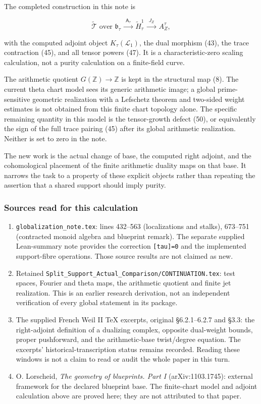 The completed construction in this note is

\[
\widetilde{\mathcal T}\text{ over }\mathfrak b_\tau
\ \xrightarrow{\ \mathsf A_\tau\ }\
\widetilde H^1_\tau
\ \xrightarrow{\ J_Z\ }\
A_Z^\tau,
\]

with the computed adjoint object \(K_\tau(\mathcal L_1)\), the dual morphism (43), the trace contraction (45), and all tensor powers (47). It is a characteristic-zero scaling calculation, not a purity calculation on a finite-field curve.

The arithmetic quotient \(G(\mathbb Z)\to\mathbb Z\) is kept in the structural map (8). The current theta chart model sees its generic arithmetic image; a global prime-sensitive geometric realization with a Lefschetz theorem and two-sided weight estimates is not obtained from this finite chart topology alone. The specific remaining quantity in this model is the tensor-growth defect (50), or equivalently the sign of the full trace pairing (45) after its global arithmetic realization. Neither is set to zero in the note.

The new work is the actual change of base, the computed right adjoint, and the cohomological placement of the finite arithmetic duality maps on that base. It narrows the task to a property of these explicit objects rather than repeating the assertion that a shared support should imply purity.

\subsubsection{Sources read for this calculation}\label{endpoint-tau_base--sources-read-for-this-calculation}

\begin{enumerate}
\def\labelenumi{\arabic{enumi}.}
\tightlist
\item
  \nolinkurl{globalization_note.tex}: lines 432--563 (localizations and stalks), 673--751 (contracted monoid algebra and blueprint remark). The separate supplied Lean-summary note provides the correction \texttt{{[}tau{]}=0} and the implemented support-fibre operations. Those source results are not claimed as new.
\item
  Retained \nolinkurl{Split_Support_Actual_Comparison/CONTINUATION.tex}: test spaces, Fourier and theta maps, the arithmetic quotient and finite jet realization. This is an earlier research derivation, not an independent verification of every global statement in its package.
\item
  The supplied French Weil II TeX excerpts, original §6.2.1--6.2.7 and §3.3: the right-adjoint definition of a dualizing complex, opposite dual-weight bounds, proper pushforward, and the arithmetic-base twist/degree equation. The excerpts' historical-transcription status remains recorded. Reading these windows is not a claim to read or audit the whole paper in this turn.
\item
  O. Lorscheid, \emph{The geometry of blueprints. Part I} (arXiv:1103.1745): external framework for the declared blueprint base. The finite-chart model and adjoint calculation above are proved here; they are not attributed to that paper.
\end{enumerate}

